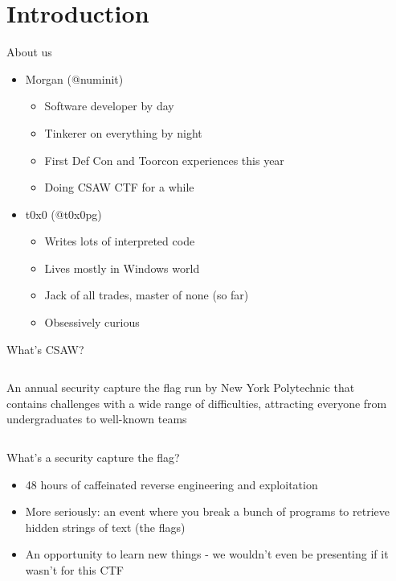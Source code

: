 
\section{Introduction}

\begin{frame}{About us}
    \begin{itemize}
        \item Morgan (@numinit)
        \begin{itemize}
            \item Software developer by day
            \item Tinkerer on everything by night
            \item First Def Con and Toorcon experiences this year
            \item Doing CSAW CTF for a while
        \end{itemize}
        \item t0x0 (@t0x0pg)
        \begin{itemize}
            \item Writes lots of interpreted code
            \item Lives mostly in Windows world
            \item Jack of all trades, master of none (so far)
            \item Obsessively curious
        \end{itemize}
    \end{itemize}
\end{frame}

\begin{frame}{What's CSAW?}
    \begin{columns}
        An annual security capture the flag run by New York Polytechnic that
        contains challenges with a \alert{wide range of difficulties},
        attracting everyone from undergraduates to well-known teams

         \\
    \end{columns}
\end{frame}

\begin{frame}{What's a security capture the flag?}
    \begin{itemize}
        \item<1-> 48 hours of caffeinated reverse engineering and exploitation
        \item<2-> More seriously: an event where you break a bunch of programs
                  to retrieve hidden strings of text (the flags)
        \item<3-> An opportunity to learn new things - we wouldn't
                  even be presenting if it wasn't for this CTF
    \end{itemize}
\end{frame}

